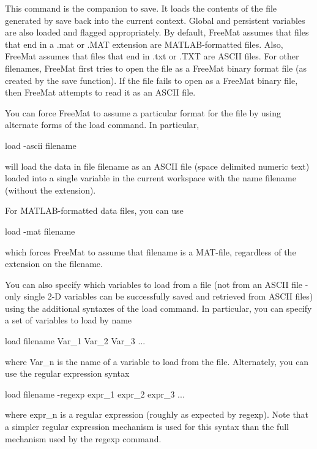  This command is the companion to {\ttfamily save}. It loads the contents of the file generated by {\ttfamily save} back into the current context. Global and persistent variables are also loaded and flagged appropriately. By default, Free\-Mat assumes that files that end in a {\ttfamily .mat} or {\ttfamily .M\-A\-T} extension are M\-A\-T\-L\-A\-B-\/formatted files. Also, Free\-Mat assumes that files that end in {\ttfamily .txt} or {\ttfamily .T\-X\-T} are A\-S\-C\-I\-I files. For other filenames, Free\-Mat first tries to open the file as a Free\-Mat binary format file (as created by the {\ttfamily save} function). If the file fails to open as a Free\-Mat binary file, then Free\-Mat attempts to read it as an A\-S\-C\-I\-I file.

You can force Free\-Mat to assume a particular format for the file by using alternate forms of the {\ttfamily load} command. In particular, \begin{DoxyVerb}  load -ascii filename
\end{DoxyVerb}
 will load the data in file {\ttfamily filename} as an A\-S\-C\-I\-I file (space delimited numeric text) loaded into a single variable in the current workspace with the name {\ttfamily filename} (without the extension).

For M\-A\-T\-L\-A\-B-\/formatted data files, you can use \begin{DoxyVerb}  load -mat filename
\end{DoxyVerb}
 which forces Free\-Mat to assume that {\ttfamily filename} is a M\-A\-T-\/file, regardless of the extension on the filename.

You can also specify which variables to load from a file (not from an A\-S\-C\-I\-I file -\/ only single 2-\/\-D variables can be successfully saved and retrieved from A\-S\-C\-I\-I files) using the additional syntaxes of the {\ttfamily load} command. In particular, you can specify a set of variables to load by name \begin{DoxyVerb}  load filename Var_1 Var_2 Var_3 ...
\end{DoxyVerb}
 where {\ttfamily Var\-\_\-n} is the name of a variable to load from the file. Alternately, you can use the regular expression syntax \begin{DoxyVerb}  load filename -regexp expr_1 expr_2 expr_3 ...
\end{DoxyVerb}
 where {\ttfamily expr\-\_\-n} is a regular expression (roughly as expected by {\ttfamily regexp}). Note that a simpler regular expression mechanism is used for this syntax than the full mechanism used by the {\ttfamily regexp} command.

